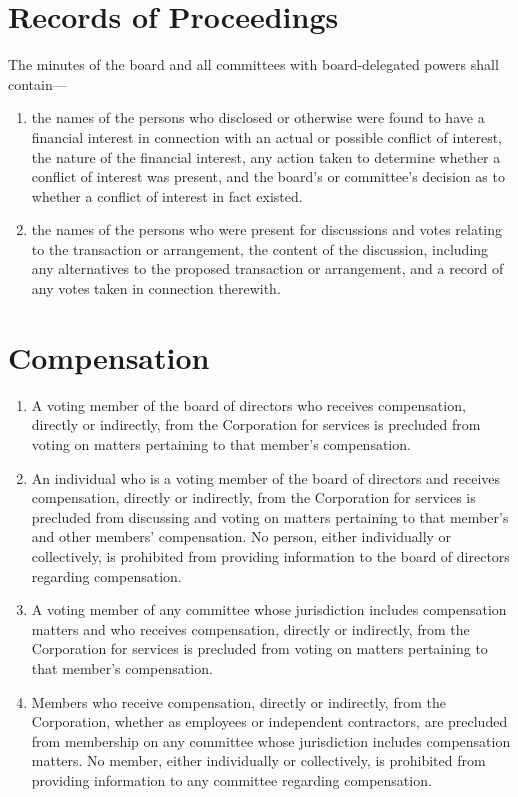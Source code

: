 \documentclass[12pt]{article}
\begin{document}
\section{Records of Proceedings}

The minutes of the board and all committees with board-delegated 
powers shall contain---

\begin{enumerate}

\item the names of the persons who disclosed or otherwise were 
found to have a financial interest in connection with an actual 
or possible conflict of interest, the nature of the financial 
interest, any action taken to determine whether a conflict of 
interest was present, and the board's or committee's decision as 
to whether a conflict of interest in fact existed. 

\item the names of the persons who were present for discussions 
and votes relating to the transaction or arrangement, the content 
of the discussion, including any alternatives to the proposed 
transaction or arrangement, and a record of any votes taken in 
connection therewith. 
\end{enumerate}

\section{Compensation}

\begin{enumerate}
\item A voting member of the board of directors who receives 
compensation, directly or indirectly, from the Corporation for 
services is precluded from voting on matters pertaining to that 
member's compensation. 

\item An individual who is a voting member of the board of 
directors and receives compensation, directly or indirectly, from 
the Corporation for services is precluded from discussing and 
voting on matters pertaining to that member's and other members' 
compensation. No person, either individually or collectively, is 
prohibited from providing information to the board of directors 
regarding compensation. 

\item A voting member of any committee whose jurisdiction 
includes compensation matters and who receives compensation, 
directly or indirectly, from the Corporation for services is 
precluded from voting on matters pertaining to that member's 
compensation. 

\item Members who receive compensation, directly or indirectly, 
from the Corporation, whether as employees or independent 
contractors, are precluded from membership on any committee whose 
jurisdiction includes compensation matters. No member, either 
individually or collectively, is prohibited from providing 
information to any committee regarding compensation. 
\end{enumerate}
\end{document}
